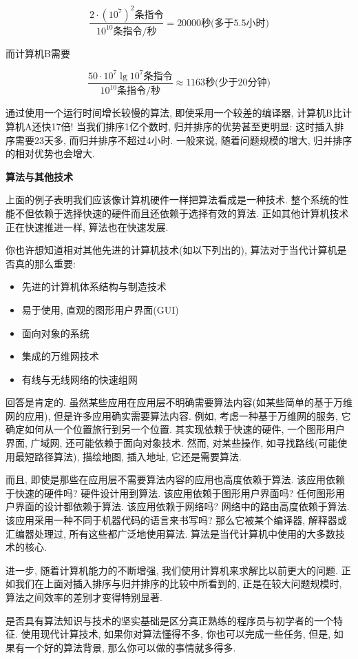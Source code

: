 \documentclass[oneside,10pt,fontset=none]{ctexbook}
\numberwithin{definition}{chapter}
\numberwithin{theorem}{chapter}
\numberwithin{lemma}{chapter}
\begin{document}
$$
\frac{2\cdot (10^7)^2\text{条指令}}{10^10\text{条指令/秒}} = 20000\text{秒(多于5.5小时)}
$$

而计算机B需要

$$
\frac{50\cdot 10^7\lg{10^7}\text{条指令}}{10^10\text{条指令/秒}} \approx 1163\text{秒(少于20分钟)}
$$

通过使用一个运行时间增长较慢的算法, 即使采用一个较差的编译器, 计算机B比计算机A还快17倍! 当我们排序1亿个数时, 归并排序的优势甚至更明显: 这时插入排序需要23天多, 而归并排序不超过4小时. 一般来说, 随着问题规模的增大, 归并排序的相对优势也会增大.

\textbf{算法与其他技术}

上面的例子表明我们应该像计算机硬件一样把算法看成是一种技术. 整个系统的性能不但依赖于选择快速的硬件而且还依赖于选择有效的算法. 正如其他计算机技术正在快速推进一样, 算法也在快速发展.

你也许想知道相对其他先进的计算机技术(如以下列出的), 算法对于当代计算机是否真的那么重要:

\begin{itemize}
    \item 先进的计算机体系结构与制造技术
    \item 易于使用, 直观的图形用户界面(GUI)
    \item 面向对象的系统
    \item 集成的万维网技术
    \item 有线与无线网络的快速组网
\end{itemize}

回答是肯定的. 虽然某些应用在应用层不明确需要算法内容(如某些简单的基于万维网的应用), 但是许多应用确实需要算法内容. 例如, 考虑一种基于万维网的服务, 它确定如何从一个位置旅行到另一个位置. 其实现依赖于快速的硬件, 一个图形用户界面, 广域网, 还可能依赖于面向对象技术. 然而, 对某些操作, 如寻找路线(可能使用最短路径算法), 描绘地图, 插入地址, 它还是需要算法.

而且, 即使是那些在应用层不需要算法内容的应用也高度依赖于算法. 该应用依赖于快速的硬件吗? 硬件设计用到算法. 该应用依赖于图形用户界面吗? 任何图形用户界面的设计都依赖于算法. 该应用依赖于网络吗? 网络中的路由高度依赖于算法. 该应用采用一种不同于机器代码的语言来书写吗? 那么它被某个编译器, 解释器或汇编器处理过, 所有这些都广泛地使用算法. 算法是当代计算机中使用的大多数技术的核心.

进一步, 随着计算机能力的不断增强, 我们使用计算机来求解比以前更大的问题. 正如我们在上面对插入排序与归并排序的比较中所看到的, 正是在较大问题规模时, 算法之间效率的差别才变得特别显著.

是否具有算法知识与技术的坚实基础是区分真正熟练的程序员与初学者的一个特征. 使用现代计算技术, 如果你对算法懂得不多, 你也可以完成一些任务, 但是, 如果有一个好的算法背景, 那么你可以做的事情就多得多.
\end{document}
